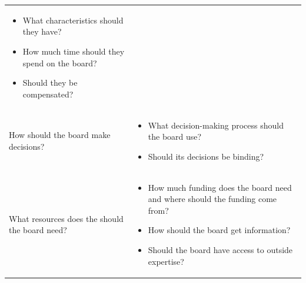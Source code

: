 \documentclass{article}
\begin{document}
\begin{table}
\begin{tabularx}{\textwidth}{p{4.5cm} X}
\begin{itemize}[leftmargin=*, nosep]
                \item What characteristics should they have?
                \item How much time should they spend on the board?
                \item Should they be compensated? \vspace{-0.2em}
            \end{itemize} \\
        \vspace{-1.4em} How should the board make decisions? &
            \begin{itemize}[leftmargin=*, nosep] \vspace{-1em}
                \item What decision-making process should the board use?
                \item Should its decisions be binding? \vspace{-0.2em}
            \end{itemize} \\
        \vspace{-1.4em} What resources does the should the board need? &
            \begin{itemize}[leftmargin=*, nosep] \vspace{-1em}
                \item How much funding does the board need and where should the funding come from?
                \item How should the board get information?
                \item Should the board have access to outside expertise? \vspace{-0.8em}
            \end{itemize} \\
    \bottomrule
  \end{tabularx}
\end{table}
\end{document}
